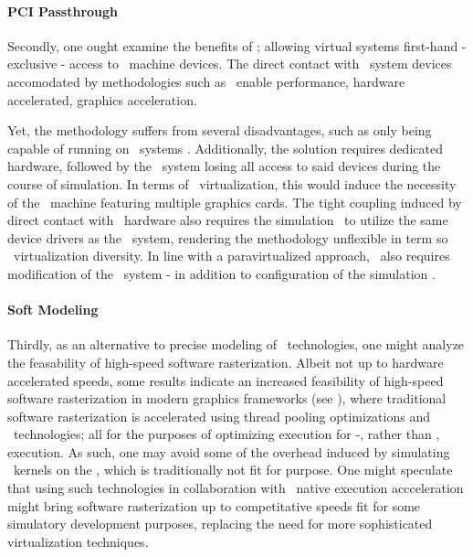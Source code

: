 \paragraph{PCI Passthrough}
\label{par:analysissolution_pcipassthrough}
Secondly, one ought examine the benefits of \dvttermpcipassthrough ; allowing virtual systems first-hand - exclusive - access to \dvttermhost\ machine devices.
The direct contact with \dvttermhost\ system devices accomodated by methodologies such as \dvttermpcipassthrough\ enable performance, hardware accelerated, graphics acceleration.

Yet, the methodology suffers from several disadvantages, such as only being capable of running on \dvttermlinux\ systems .
Additionally, the solution requires dedicated hardware, followed by the \dvttermhost\ system losing all access to said devices during the course of simulation.
In terms of \dvttermgpu\ virtualization, this would induce the necessity of the \dvttermhost\ machine featuring multiple graphics cards.
The tight coupling induced by direct contact with \dvttermhost\ hardware also requires the simulation \dvttermtarget\ to utilize the same device drivers as the \dvttermhost\ system, rendering the methodology unflexible in term so \dvttermgpu\ virtualization diversity.
In line with a paravirtualized approach, \dvttermpcipassthrough\ also requires modification of the \dvttermtarget\ system - in addition to configuration of the simulation \dvttermhost .


\paragraph{Soft Modeling}
\label{par:analysissolution_softmodeling}
Thirdly, as an alternative to precise modeling of \dvttermgpu\ technologies, one might analyze the feasability of high-speed software rasterization.
Albeit not up to hardware accelerated speeds, some results indicate an increased feasibility of high-speed software rasterization in modern graphics frameworks (see ), where traditional software rasterization is accelerated using thread pooling optimizations and \dvttermsimd\ technologies; all for the purposes of optimizing execution for \dvttermcpu -, rather than \dvttermgpu , execution.
As such, one may avoid some of the overhead induced by simulating \dvttermgpu\ kernels on the \dvttermcpu , which is traditionally not fit for purpose.
One might speculate that using such technologies in collaboration with \dvttermhost\ native execution accceleration might bring software rasterization up to competitative speeds fit for some simulatory development purposes, replacing the need for more sophisticated virtualization techniques.

